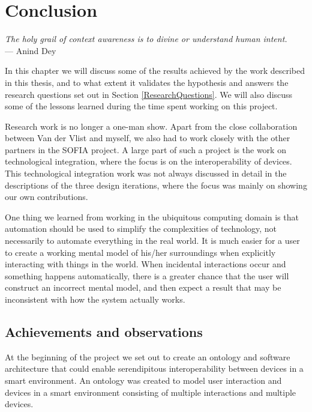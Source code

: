 \chapter{Conclusion}
\label{Conclusion}

\begin{flushright}{\slshape    
The holy grail of context awareness is to divine or understand human intent.} \\ \medskip
    ---  Anind Dey
\end{flushright}

In this chapter we will discuss some of the results achieved by the work described in this thesis, and to what extent it validates the hypothesis and answers the research questions set out in Section \ref{ResearchQuestions}. We will also discuss some of the lessons learned during the time spent working on this project.

Research work is no longer a one-man show. Apart from the close collaboration between Van der Vlist \cite{Bram} and myself, we also had to work closely with the other partners in the \ac{SOFIA} project. A large part of such a project is the work on technological integration, where the focus is on the interoperability of devices. This technological integration work was not always discussed in detail in the descriptions of the three design iterations, where the focus was mainly on showing our own contributions. 

One thing we learned from working in the ubiquitous computing domain is that automation should be used to simplify the complexities of technology, not necessarily to automate everything in the real world. It is much easier for a user to create a working mental model of his/her surroundings when explicitly interacting with things in the world. When incidental interactions occur and something happens automatically, there is a greater chance that the user will construct an incorrect mental model, and then expect a result that may be inconsistent with how the system actually works.

\section{Achievements and observations}

At the beginning of the project we set out to create an ontology and software architecture that could enable serendipitous interoperability between devices in a smart environment. An ontology was created to model user interaction and devices in a smart environment consisting of multiple interactions and multiple devices.%

